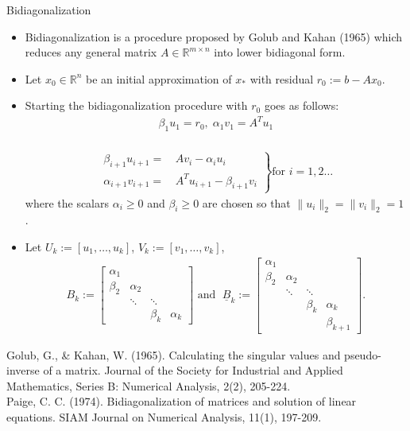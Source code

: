 \documentclass[t,usepdftitle=false]{beamer}
\begin{document}
\begin{frame}{Bidiagonalization}
\begin{itemize}
\item Bidiagonalization is a procedure proposed by Golub and Kahan (1965) which reduces any general matrix $A\in\mathbb{R}^{m\times n}$ into lower bidiagonal form.
\item[] Let $x_0\in\mathbb{R}^n$ be an initial approximation of $x_*$ with residual $r_0:=b-Ax_0$.
\item[] Starting the bidiagonalization procedure with $r_0$ goes as follows:\vspace{-.1cm}
\begin{align*}
\beta_1u_1=r_0,\;\alpha_1v_1=A^Tu_1
\end{align*}
\vspace{-1.1cm}\\
\begin{align*}
\left.
\begin{aligned}
\beta_{i+1}u_{i+1}=&\,Av_i-\alpha_iu_i\\
\alpha_{i+1}v_{i+1}=&\,A^Tu_{i+1}-\beta_{i+1}v_i
\end{aligned}
\right\}
\text{for }i=1,2\dots
\end{align*}
where the scalars $\alpha_i\geq0$ and $\beta_i\geq0$ are chosen so that $\|u_i\|_2=\|v_i\|_2=1$.
\item[] Let $U_k:=[u_1,\dots,u_k]$, $V_k:=[v_1,\dots,v_k]$,\vspace{-.15cm}
{\footnotesize\begin{align*}
B_k:=
\begin{bmatrix}
\alpha_1&&&\\
\beta_2&\alpha_2&&\\
&\ddots&\ddots&\\
&&\beta_k&\alpha_k
\end{bmatrix}
\text{ and }\;
\underline{B}_k:=
\begin{bmatrix}
\alpha_1&&&\\
\beta_2&\alpha_2&&\\
&\ddots&\ddots&\\
&&\beta_k&\alpha_k\\
&&&\beta_{k+1}
\end{bmatrix}.
\end{align*}}
\end{itemize}
\tiny{Golub, G., \& Kahan, W. (1965). Calculating the singular values and pseudo-inverse of a matrix. Journal of the Society for Industrial and Applied Mathematics, Series B: Numerical Analysis, 2(2), 205-224.}\smallskip\\
\tiny{Paige, C. C. (1974). Bidiagonalization of matrices and solution of linear equations. SIAM Journal on Numerical Analysis, 11(1), 197-209.}
\end{frame}
\end{document}
